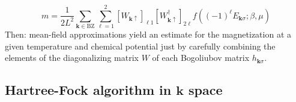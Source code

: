 \begin{equation}\label{appeq:antiferromagnet-magnetization-self-consistence-finite-temperature}
	m = \frac{1}{2L^2} \sum_{\mathbf{k} \in \mathrm{BZ}} \sum_{\ell=1}^2 
	[
		W_{\mathbf{k}\uparrow}
	]_{\ell 1} [
		W_{\mathbf{k}\uparrow}^\dagger
	]_{2 \ell}
	f\left(
		(-1)^\ell E_{\mathbf{k}\sigma}; \beta,\mu
	\right)
\end{equation}
Then: mean-field approximations yield an estimate for the magnetization at a given temperature and chemical potential just by carefully combining the elements of the diagonalizing matrix $W$ of each Bogoliubov matrix $h_{\mathbf{k}\sigma}$.

\subsection{Hartree-Fock algorithm in $\mathbf{k}$ space}\label{appsubsec:hartree-fock-algorithm}


